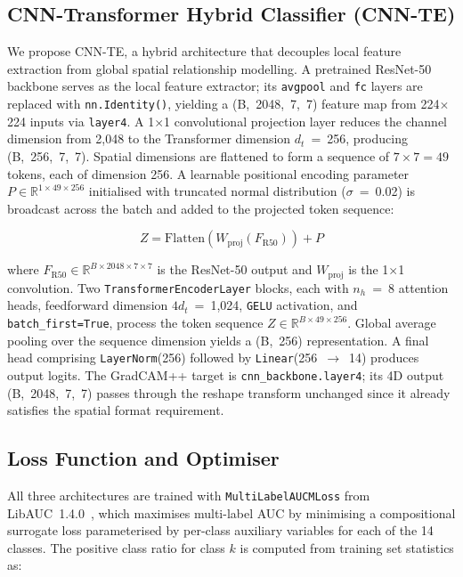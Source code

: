\documentclass[conference]{IEEEtran}
\begin{document}
\subsection{CNN-Transformer Hybrid Classifier (CNN-TE)}

We propose CNN-TE, a hybrid architecture that decouples local feature
extraction from global spatial relationship modelling. A pretrained
ResNet-50~\cite{he2016} backbone serves as the local feature extractor;
its \texttt{avgpool} and \texttt{fc} layers are replaced with
\texttt{nn.Identity()}, yielding a (B,~2048,~7,~7) feature map from
224$\times$224 inputs via \texttt{layer4}. A 1$\times$1 convolutional
projection layer reduces the channel dimension from 2,048 to the
Transformer dimension $d_t$~=~256, producing (B,~256,~7,~7). Spatial
dimensions are flattened to form a sequence of $7\times7=49$ tokens,
each of dimension 256. A learnable positional encoding parameter
$P \in \mathbb{R}^{1 \times 49 \times 256}$ initialised with truncated
normal distribution ($\sigma$~=~0.02) is broadcast across the batch
and added to the projected token sequence:

\begin{equation}
Z = \text{Flatten}(W_{\text{proj}}(F_{\text{R50}})) + P
\label{eq:tokens}
\end{equation}

where $F_{\text{R50}} \in \mathbb{R}^{B \times 2048 \times 7 \times 7}$
is the ResNet-50 output and $W_{\text{proj}}$ is the 1$\times$1
convolution. Two \texttt{TransformerEncoderLayer} blocks, each with
$n_h$~=~8 attention heads, feedforward dimension $4d_t$~=~1,024,
\texttt{GELU} activation, and \texttt{batch\_first=True}, process the
token sequence $Z \in \mathbb{R}^{B \times 49 \times 256}$. Global
average pooling over the sequence dimension yields a
(B,~256) representation. A final head comprising \texttt{LayerNorm}(256)
followed by \texttt{Linear}(256~$\rightarrow$~14) produces output
logits. The GradCAM++ target is \texttt{cnn\_backbone.layer4}; its
4D output (B,~2048,~7,~7) passes through the reshape transform
unchanged since it already satisfies the spatial format requirement.

\subsection{Loss Function and Optimiser}

All three architectures are trained with
\texttt{MultiLabelAUCMLoss} from LibAUC~1.4.0~\cite{yuan2021},
which maximises multi-label AUC by minimising a compositional
surrogate loss parameterised by per-class auxiliary variables for
each of the 14 classes. The positive class ratio for class $k$ is
computed from training set statistics as:
\end{document}
